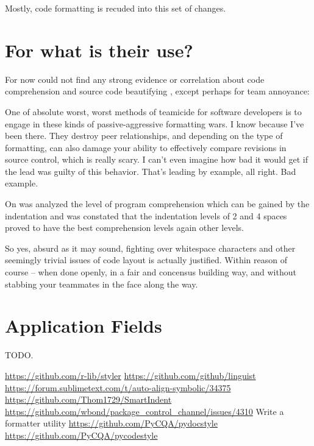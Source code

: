 Mostly,
code formatting is recuded into this set of changes.



\section{For what is their use?}

For now could not find any strong evidence or correlation about code
comprehension and source code beautifying \cite{improvingCodeReadability},
except perhaps for team annoyance:

\begin{citacao}
One of absolute worst, worst methods of teamicide for software developers is to engage
in these kinds of passive-aggressive formatting wars. I know because I've been there.
They destroy peer relationships, and depending on the type of formatting, can also damage
your ability to effectively compare revisions in source control, which is really scary.
I can't even imagine how bad it would get if the lead was guilty of this behavior. That's
leading by example, all right. Bad example. \cite{Atwood}
\end{citacao}

On  was analyzed the level of program
comprehension which can be gained by the indentation and was constated that
the indentation levels of 2 and 4 spaces proved to have the best
comprehension levels again other levels.

\begin{citacao}
So yes, absurd as it may sound, fighting over whitespace characters and other seemingly
trivial issues of code layout is actually justified. Within reason of course -- when done
openly, in a fair and concensus building way, and without stabbing your teammates in the
face along the way. \cite{Atwood}
\end{citacao}



\section{Application Fields}

TODO.

\url{https://github.com/r-lib/styler}
\url{https://github.com/github/linguist}
\url{https://forum.sublimetext.com/t/auto-align-symbolic/34375}
\url{https://github.com/Thom1729/SmartIndent}
\url{https://github.com/wbond/package_control_channel/issues/4310} Write a formatter utility
\url{https://github.com/PyCQA/pydocstyle}
\url{https://github.com/PyCQA/pycodestyle}



